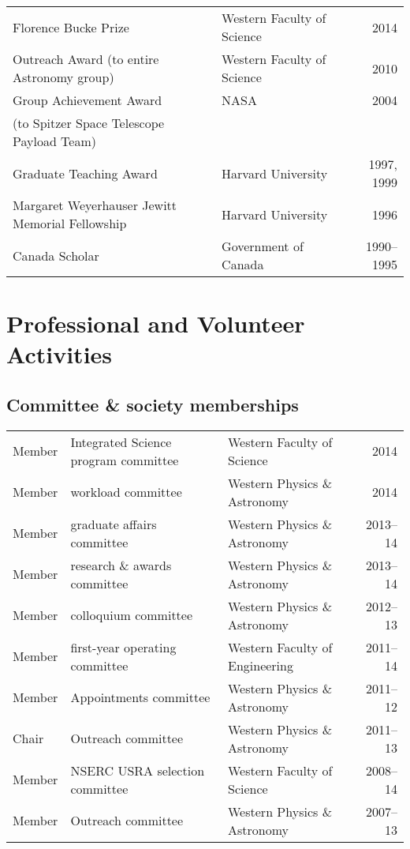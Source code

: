 \documentclass[12pt]{article}
\begin{document}
\begin{tabularx}{\textwidth}{lXr}
Florence Bucke Prize& Western Faculty of Science & 2014\\
Outreach Award (to entire Astronomy group)& Western Faculty of Science & 2010 \\
Group Achievement Award & NASA  & 2004 \\
(to Spitzer Space Telescope Payload Team)& &\\
Graduate Teaching Award& Harvard University & 1997, 1999 \\
Margaret Weyerhauser Jewitt Memorial Fellowship& Harvard University & 1996\\
Canada Scholar & Government of Canada&1990--1995\\
\end{tabularx}


\section{Professional and Volunteer Activities}

\subsection{Committee \& society memberships}
\begin{tabularx}{\textwidth}{lXXr}
Member& Integrated Science program committee&  Western Faculty of Science& 2014\\
Member& workload committee&  Western Physics \& Astronomy& 2014\\
Member& graduate affairs committee&  Western Physics \& Astronomy& 2013--14\\
Member& research \& awards committee&  Western Physics \& Astronomy& 2013--14\\
Member& colloquium committee& Western Physics \& Astronomy& 2012--13\\
Member& first-year operating committee& Western Faculty of Engineering &  2011--14\\
Member & Appointments committee& Western Physics \& Astronomy& 2011--12\\
Chair& Outreach committee& Western Physics \& Astronomy& 2011--13\\
Member&  NSERC USRA selection committee& Western Faculty of Science& 2008--14\\
Member&  Outreach committee& Western Physics \& Astronomy& 2007--13\\
\end{tabularx}
\end{document}
